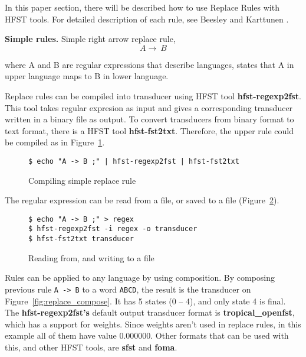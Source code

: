 \documentclass{llncs}
\begin{document}
In this paper section, there will be described how to use Replace Rules with HFST tools. For detailed description of each rule, see Beesley and Karttunen \cite{beesley/2003}.




\textbf{Simple rules.} Simple right arrow replace rule,
\begin{equation}
A \rightarrow\ B
\end{equation}

where A and B are regular expressions that describe languages, states that A in upper language maps to B in lower language.

Replace rules can be compiled into transducer using HFST tool \textbf{hfst-regexp\-2fst}.
This tool takes regular expresion as input and gives a corresponding transducer written in a binary file as output. To convert transducers from binary format to text format, there is a HFST tool \textbf{hfst-fst2txt}. Therefore, the upper rule could be compiled as in Figure~\ref{fig:simple_replace}.

\begin{figure} [h!]
\begin{verbatim}
$ echo "A -> B ;" | hfst-regexp2fst | hfst-fst2txt
\end{verbatim}
\caption{Compiling simple replace rule}
\label{fig:simple_replace}
\end{figure}


The regular expression can be read from a file, or saved to a file (Figure~\ref{fig:read_from_file}). 

\begin{figure} [h!]
\begin{verbatim}
$ echo "A -> B ;" > regex
$ hfst-regexp2fst -i regex -o transducer
$ hfst-fst2txt transducer
\end{verbatim}
\caption{Reading from, and writing to a file}
\label{fig:read_from_file}
\end{figure}


Rules can be applied to any language by using composition. By composing previous rule \verb!A -> B! to a word \verb!ABCD!, the result is the transducer on Figure~\ref{fig:replace_compose}. It has 5 states (0 -- 4), and only state 4 is final. The \textbf{hfst-regexp2fst's} default output transducer format is \textbf{tropical\_openfst}, which has a support for weights. Since weights aren't used in replace rules, in this example all of them have value 0.000000. Other formats that can be used with this, and other HFST tools, are \textbf{sfst} and \textbf{foma}.
\end{document}
